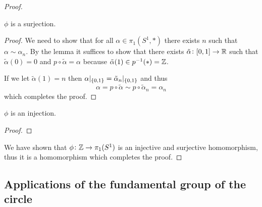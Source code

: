 \documentclass[11pt,a4paper]{article}
\begin{document}
\begin{proof}
  \begin{proposition}
    $\phi$ is a surjection.
  \end{proposition}
  \begin{proof}
    We need to show that for all $\alpha \in \pi_1(S^1, *)$ there exists
    $n$ such that $\alpha \sim \alpha_n$.
    By the lemma it suffices to show that there exists
    $\tilde \alpha \colon [0,1] \to \mathbb{R}$ such that $\tilde \alpha(0) = 0$
    and $p \circ \tilde \alpha = \alpha$ because
    $\tilde \alpha(1) \in p^{-1}(*) = \mathbb{Z}$.
    
    If we let $\tilde \alpha(1) = n$ then
    $\alpha\vert_{\left\{0,1\right\}} = \tilde\alpha_n\vert_{\left\{0,1\right\}}$ and thus
    \[
      \alpha = p \circ \tilde \alpha \sim p \circ \tilde \alpha_n = \alpha_n
    \]
    which completes the proof.
  \end{proof}

  \begin{proposition}
    $\phi$ is an injection.
  \end{proposition}
  \begin{proof}

  \end{proof}

  We have shown that $\phi \colon \mathbb{Z} \to \pi_1(S^1)$ is an injective
  and surjective homomorphism, thus it is a homomorphism which completes the
  proof.
\end{proof}

\subsection{Applications of the fundamental group of the circle}
\end{document}

